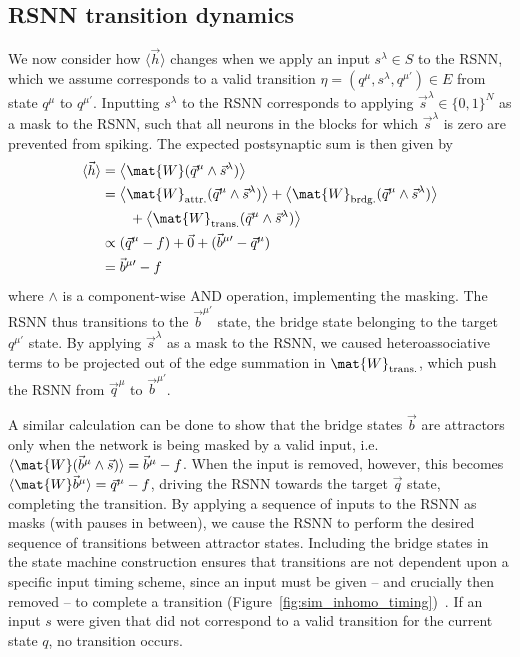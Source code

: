 \subsection{RSNN transition dynamics}
\label{sec:rsnn_transition_dynamics}

We now consider how $\langle \vec{h} \rangle$ changes when we apply an input $s^\lambda \in S$ to the RSNN, which we assume corresponds to a valid transition $\eta = (q^\mu, s^\lambda, q^{\mu \prime}) \in E$ from state $q^\mu$ to $q^{\mu \prime}$. Inputting $s^\lambda$ to the RSNN corresponds to applying $\vec{s}^\lambda \in \{0, 1\}^N$ as a mask to the RSNN, such that all neurons in the blocks for which $\vec{s}^\lambda$ is zero are prevented from spiking.
The expected postsynaptic sum is then given by
\begin{equation}
\begin{split}
\langle \vec{h} \rangle & = \bigl \langle \mat{W} ( \vec{q}^\mu \land \vec{s}^\lambda )\bigr \rangle \\
& =  \bigl \langle \mat{W}_\text{attr.}(  \vec{q}^\mu \land \vec{s}^\lambda ) \bigr \rangle  + \bigl \langle \mat{W}_\text{brdg.}(  \vec{q}^\mu \land \vec{s}^\lambda ) \bigr \rangle \\ & \quad \quad+  \bigl \langle \mat{W}_\text{trans.}(  \vec{q}^\mu \land \vec{s}^\lambda ) \bigr \rangle  \\
& \propto (\vec{q}^\mu - f) +\vec{0} +  (\vec{b}^{\mu \prime} - \vec{q}^\mu) \\
& = \vec{b}^{\mu \prime} - f
\end{split}
\label{eqn:mean_h_tran}
\end{equation}
where $\land$ is a component-wise $\mathrm{AND}$ operation, implementing the masking. The RSNN thus transitions to the $\vec{b}^{\mu \prime}$ state, the bridge state belonging to the target $q^{\mu\prime}$ state.
By applying $\vec{s}^\lambda$ as a mask to the RSNN, we caused heteroassociative terms to be projected out of the edge summation in $\mat{W}_\text{trans.}$, which push the RSNN from $\vec{q}^\mu$ to $\vec{b}^{\mu \prime}$.

A similar calculation can be done to show that the bridge states $\vec{b}$ are attractors only when the network is being masked by a valid input, i.e. $ \langle \mat{W} (\vec{b}^\mu \land \vec{s} )  \rangle = \vec{b}^\mu - f$. When the input is removed, however, this becomes $\langle \mat{W} \vec{b}^\mu  \rangle = \vec{q}^\mu - f$, driving the RSNN towards the target $\vec{q}$ state, completing the transition. By applying a sequence of inputs to the RSNN as masks (with pauses in between), we cause the RSNN to perform the desired sequence of transitions between attractor states. Including the bridge states in the state machine construction ensures that transitions are not dependent upon a specific input timing scheme, since an input must be given -- and crucially then removed -- to complete a transition \mbox{(Figure \ref{fig:sim_inhomo_timing})}~\cite{cotteret_vector_2024}. If an input $s$ were given that did not correspond to a valid transition for the current state $q$, no transition occurs.

